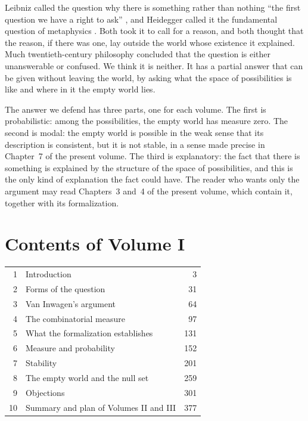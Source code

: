 \documentclass{situationist-preprint}
\begin{document}
Leibniz called the question why there is something rather than nothing \enquote{the first question we have a right to ask} \citep[\S 7]{Leibniz1714}, and Heidegger called it the fundamental question of metaphysics \citep{Heidegger1935}. Both took it to call for a reason, and both thought that the reason, if there was one, lay outside the world whose existence it explained. Much twentieth-century philosophy concluded that the question is either unanswerable or confused. We think it is neither. It has a partial answer that can be given without leaving the world, by asking what the space of possibilities is like and where in it the empty world lies.

The answer we defend has three parts, one for each volume. The first is probabilistic: among the possibilities, the empty world has measure zero. The second is modal: the empty world is possible in the weak sense that its description is consistent, but it is not stable, in a sense made precise in Chapter~7 of the present volume. The third is explanatory: the fact that there is something is explained by the structure of the space of possibilities, and this is the only kind of explanation the fact could have. The reader who wants only the argument may read Chapters~3 and~4 of the present volume, which contain it, together with its formalization.

\section*{Contents of Volume I}

\begin{center}\small
\begin{tabular}{@{}rlr@{}}
1 & Introduction & 3 \\
2 & Forms of the question & 31 \\
3 & Van Inwagen's argument & 64 \\
4 & The combinatorial measure & 97 \\
5 & What the formalization establishes & 131 \\
6 & Measure and probability & 152 \\
7 & Stability & 201 \\
8 & The empty world and the null set & 259 \\
9 & Objections & 301 \\
10 & Summary and plan of Volumes II and III & 377 \\
\end{tabular}
\end{center}
\end{document}

